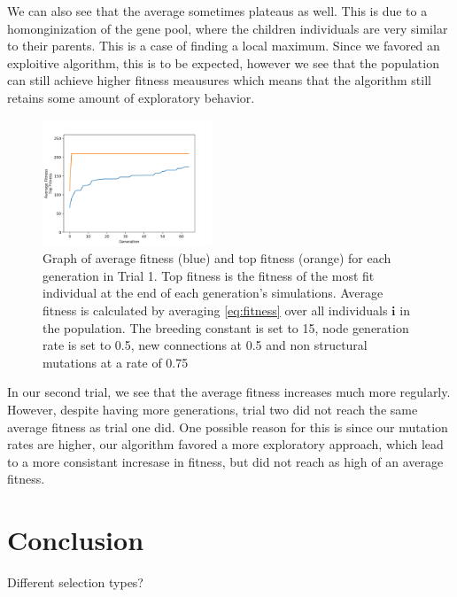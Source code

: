\documentclass{article}
\begin{document}
\begin{multicols}{2}
We can also see that the average sometimes plateaus as well. This is due to a
homonginization of the gene pool, where the children individuals are very
similar to their parents. This is a case of finding a local maximum. Since we
favored an exploitive algorithm, this is to be expected, however we see that the
population can still achieve higher fitness meausures which means that the
algorithm still retains some amount of exploratory behavior.

\begin{figure}[H]\label{fig:fitness graph}
\centering
\includegraphics[width=0.45\textwidth]{fig_2}
\begin{changemargin}{0.15in}{0.15in}
  \caption{Graph of average fitness (blue) and top fitness (orange) for each
    generation in Trial 1. Top fitness is the fitness of the most fit individual
    at the end of each generation's simulations. Average fitness is calculated
    by averaging \eqref{eq:fitness} over all individuals $\bm{i}$ in the
    population. The breeding constant is set to 15, node generation rate is set
    to 0.5, new connections at 0.5 and non structural mutations at a rate of
    0.75}
\end{changemargin}
\end{figure}

In our second trial, we see that the average fitness increases much more
regularly. However, despite having more generations, trial two did not reach the
same average fitness as trial one did. One possible reason for this is since our
mutation rates are higher, our algorithm favored a more exploratory approach,
which lead to a more consistant incresase in fitness, but did not reach as high
of an average fitness.


\section{Conclusion}
Different selection types?
\blindtext


\end{multicols}
\end{document}
